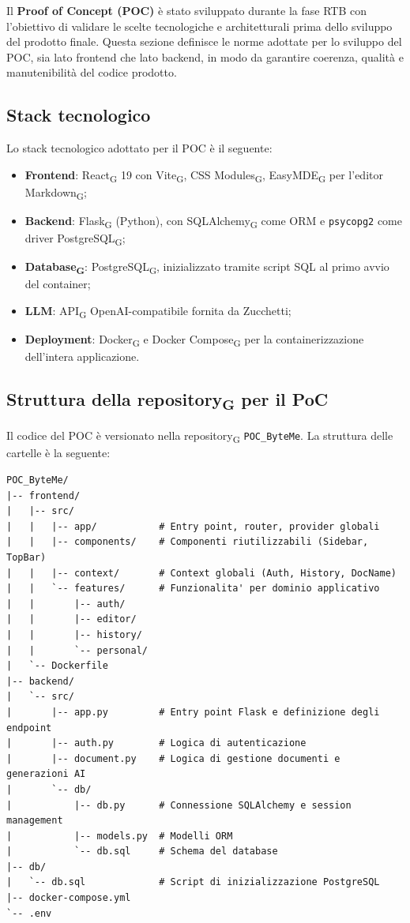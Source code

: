 \documentclass[11pt,a4paper]{article}
\newcommand{\gls}[1]{#1\textsubscript{G}}
\begin{document}
Il \textbf{Proof of Concept (POC)} è stato sviluppato durante la fase RTB con l'obiettivo di validare le scelte tecnologiche e architetturali prima dello sviluppo del prodotto finale. Questa sezione definisce le norme adottate per lo sviluppo del POC, sia lato frontend che lato backend, in modo da garantire coerenza, qualità e manutenibilità del codice prodotto.
 
\subsection{Stack tecnologico}
Lo stack tecnologico adottato per il POC è il seguente:
\begin{itemize}
    \item \textbf{Frontend}: \gls{React} 19 con \gls{Vite}, \gls{CSS Modules}, \gls{EasyMDE} per l'editor \gls{Markdown};
    \item \textbf{Backend}: \gls{Flask} (Python), con \gls{SQLAlchemy} come ORM e \texttt{psycopg2} come driver \gls{PostgreSQL};
    \item \textbf{\gls{Database}}: \gls{PostgreSQL}, inizializzato tramite script SQL al primo avvio del container;
    \item \textbf{LLM}: \gls{API} OpenAI-compatibile fornita da Zucchetti;
    \item \textbf{Deployment}: \gls{Docker} e \gls{Docker Compose} per la containerizzazione dell'intera applicazione.
\end{itemize}
 

\subsection{Struttura della \gls{repository} per il PoC}
Il codice del POC è versionato nella \gls{repository} \texttt{POC\_ByteMe}. La struttura delle cartelle è la seguente:

\begin{verbatim}
POC_ByteMe/
|-- frontend/
|   |-- src/
|   |   |-- app/           # Entry point, router, provider globali
|   |   |-- components/    # Componenti riutilizzabili (Sidebar, TopBar)
|   |   |-- context/       # Context globali (Auth, History, DocName)
|   |   `-- features/      # Funzionalita' per dominio applicativo
|   |       |-- auth/
|   |       |-- editor/
|   |       |-- history/
|   |       `-- personal/
|   `-- Dockerfile
|-- backend/
|   `-- src/
|       |-- app.py         # Entry point Flask e definizione degli endpoint
|       |-- auth.py        # Logica di autenticazione
|       |-- document.py    # Logica di gestione documenti e generazioni AI
|       `-- db/
|           |-- db.py      # Connessione SQLAlchemy e session management
|           |-- models.py  # Modelli ORM
|           `-- db.sql     # Schema del database
|-- db/
|   `-- db.sql             # Script di inizializzazione PostgreSQL
|-- docker-compose.yml
`-- .env
\end{verbatim}
 
\end{document}
